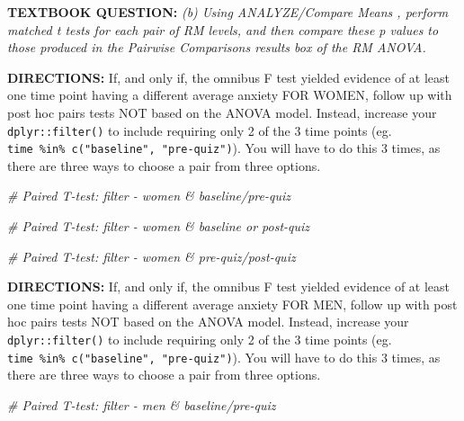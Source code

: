 \documentclass[
]{article}
\newenvironment{Shaded}{\begin{snugshade}}{\end{snugshade}}
\newcommand{\CommentTok}[1]{\textcolor[rgb]{0.56,0.35,0.01}{\textit{#1}}}
\begin{document}
\textbf{TEXTBOOK QUESTION:} \emph{(b) Using ANALYZE/Compare Means ,
perform matched t tests for each pair of RM levels, and then compare
these p values to those produced in the Pairwise Comparisons results box
of the RM ANOVA.}

\textbf{DIRECTIONS:} If, and only if, the omnibus F test yielded
evidence of at least one time point having a different average anxiety
FOR WOMEN, follow up with post hoc pairs tests NOT based on the ANOVA
model. Instead, increase your \texttt{dplyr::filter()} to include
requiring only 2 of the 3 time points (eg.
\texttt{time\ \%in\%\ c("baseline",\ "pre-quiz")}). You will have to do
this 3 times, as there are three ways to choose a pair from three
options.

\begin{Shaded}
\begin{Highlighting}[]
\CommentTok{# Paired T-test: filter - women & baseline/pre-quiz}
\end{Highlighting}
\end{Shaded}

\begin{Shaded}
\begin{Highlighting}[]
\CommentTok{# Paired T-test: filter - women & baseline or post-quiz}
\end{Highlighting}
\end{Shaded}

\begin{Shaded}
\begin{Highlighting}[]
\CommentTok{# Paired T-test: filter - women & pre-quiz/post-quiz}
\end{Highlighting}
\end{Shaded}

\clearpage

\textbf{DIRECTIONS:} If, and only if, the omnibus F test yielded
evidence of at least one time point having a different average anxiety
FOR MEN, follow up with post hoc pairs tests NOT based on the ANOVA
model. Instead, increase your \texttt{dplyr::filter()} to include
requiring only 2 of the 3 time points (eg.
\texttt{time\ \%in\%\ c("baseline",\ "pre-quiz")}). You will have to do
this 3 times, as there are three ways to choose a pair from three
options.

\begin{Shaded}
\begin{Highlighting}[]
\CommentTok{# Paired T-test: filter - men & baseline/pre-quiz}
\end{Highlighting}
\end{Shaded}
\end{document}
